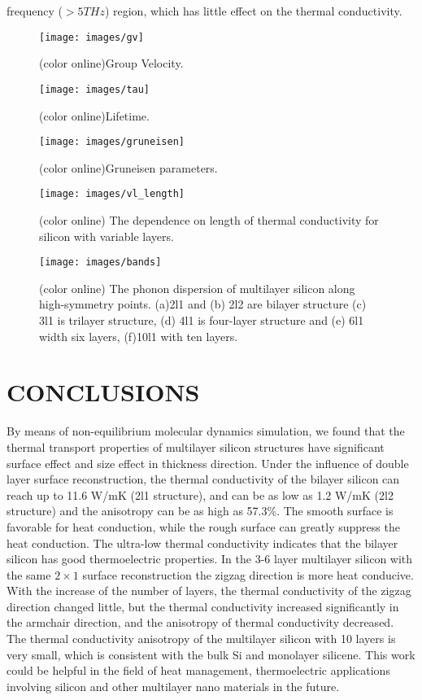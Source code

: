 \documentclass[%
 reprint,
 amsmath,amssymb,
 aps,
 prb,
]{revtex4-1}
\begin{document}
frequency ($>5THz$) region, which has little effect on the thermal conductivity.

\begin{figure}[b]
\texttt{[image: images/gv]}
\caption{\label{fig:gv} (color online)Group Velocity.}
\end{figure}

\begin{figure}[b]
\texttt{[image: images/tau]}
\caption{\label{fig:tau} (color online)Lifetime.}
\end{figure}

\begin{figure}[b]
\texttt{[image: images/gruneisen]}
\caption{\label{fig:gruneisen} (color online)Gruneisen parameters.}
\end{figure}

\begin{figure}[b]
\texttt{[image: images/vl\_length]}
\caption{\label{fig:vl_length}(color online) The dependence on length of thermal conductivity for silicon with variable layers.}
\end{figure}

\begin{figure}[b]
\texttt{[image: images/bands]}
\caption{\label{fig:bands}(color online) The phonon dispersion of multilayer silicon along high-symmetry points. (a)2l1 and (b) 2l2 are bilayer structure (c) 3l1 is trilayer structure, (d) 4l1 is four-layer structure and (e) 6l1 width six layers, (f)10l1 with ten layers.}
\end{figure}

\section{CONCLUSIONS}

By means of non-equilibrium molecular dynamics simulation, we found that the thermal transport properties of multilayer silicon structures have significant surface effect and size effect in thickness direction. Under the influence of double layer surface reconstruction, the thermal conductivity of the bilayer silicon can reach up to 11.6 W/mK (2l1 structure), and can be as low as 1.2 W/mK (2l2 structure) and the anisotropy can be as high as 57.3\%. The smooth surface is favorable for heat conduction, while the rough surface can greatly suppress the heat conduction. The ultra-low thermal conductivity indicates that the bilayer silicon has good thermoelectric properties. In the 3-6 layer multilayer silicon with the same $2 \times 1$ surface reconstruction the zigzag direction is more heat conducive. With the increase of the number of layers, the thermal conductivity of the zigzag direction changed little, but the thermal conductivity increased significantly in the armchair direction, and the anisotropy of thermal conductivity decreased. The thermal conductivity anisotropy of the multilayer silicon with 10 layers is very small, which is consistent with the bulk Si and monolayer silicene. This work could be helpful in the field of heat management, thermoelectric applications involving silicon and other multilayer nano materials in the future.
\end{document}
